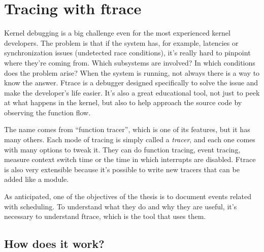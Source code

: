 \chapter{Tracing with ftrace}
\label{chap:ftrace}
Kernel debugging is a big challenge even for the most experienced kernel developers. The problem is that if the system has, for example, latencies or synchronization issues (undetected race conditions), it's really hard to pinpoint where they're coming from. Which subsystems are involved? In which conditions does the problem arise? When the system is running, not always there is a way to know the answer. Ftrace is a debugger designed specifically to solve the issue and make the developer's life easier. It's also a great educational tool, not just to peek at what happens in the kernel, but also to help approach the source code by observing the function flow.

The name comes from ``function tracer'', which is one of its features, but it has many others. Each mode of tracing is simply called a \textit{tracer}, and each one comes with many options to tweak it. They can do function tracing, event tracing, measure context switch time or the time in which interrupts are disabled. Ftrace is also very extensible because it's possible to write new tracers that can be added like a module.

As anticipated, one of the objectives of the thesis is to document events related with scheduling. To understand what they do and why they are useful, it's necessary to understand ftrace, which is the tool that uses them.
\section{How does it work?}
\label{sec:how_does_it_work}

